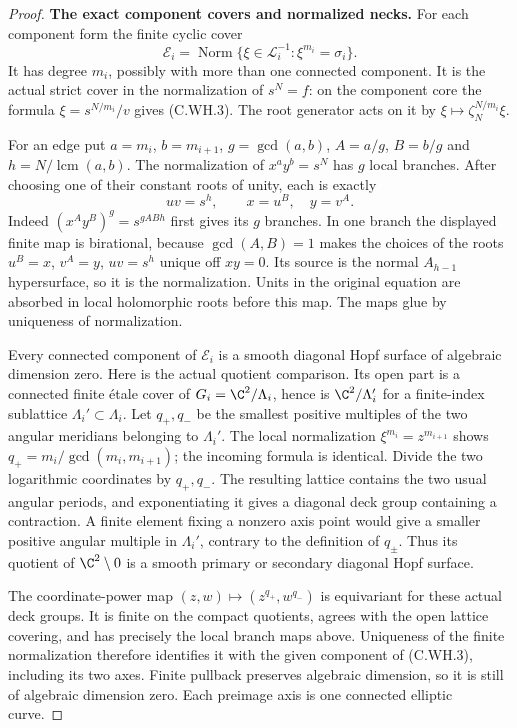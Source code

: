 \begin{proof}
\par\medskip\noindent\textbf{The exact component covers and normalized necks.}
For each component form the finite cyclic
cover
\[
 \mathcal E_i=
 \operatorname{Norm}
 \{\xi\in\mathcal L_i^{-1}:
                         \xi^{m_i}=\sigma_i\}.
\tag{C.WH.3}
\]
It has degree $m_i$, possibly with more
than one connected component. It is
the actual strict cover in the
normalization of $s^N=f$:
on the component core the formula
$\xi=s^{N/m_i}/v$ gives (C.WH.3).
The root generator acts on it by
$\xi\mapsto\zeta_N^{N/m_i}\xi$.

For an edge put $a=m_i$, $b=m_{i+1}$,
$g=\gcd(a,b)$, $A=a/g$, $B=b/g$ and
$h=N/\operatorname{lcm}(a,b)$.
The normalization of $x^a y^b=s^N$
has $g$ local branches. After choosing
one of their constant roots of unity,
each is exactly
\[
      uv=s^h,\qquad x=u^B,\quad y=v^A.
\tag{C.WH.4}
\]
Indeed $(x^Ay^B)^g=s^{gABh}$ first
gives its $g$ branches. In one branch
the displayed finite map is
birational, because $\gcd(A,B)=1$
makes the choices of the roots
$u^B=x$, $v^A=y$, $uv=s^h$ unique
off $xy=0$. Its source is the normal
$A_{h-1}$ hypersurface, so it is the
normalization. Units in the original
equation are absorbed in local
holomorphic roots before this map.
The maps glue by uniqueness of
normalization.

Every connected component of
$\mathcal E_i$ is a smooth diagonal
Hopf surface of algebraic dimension
zero. Here is the actual quotient
comparison. Its open part is a
connected finite \'{e}tale cover of
$G_i=\C^2/\Lambda_i$, hence is
$\C^2/\Lambda_i'$ for a finite-index
sublattice $\Lambda_i'\subset\Lambda_i$.
Let $q_+,q_-$ be the smallest positive
multiples of the two angular meridians
belonging to $\Lambda_i'$.
The local normalization
$\xi^{m_i}=z^{m_{i+1}}$ shows
$q_+=m_i/\gcd(m_i,m_{i+1})$;
the incoming formula is identical.
Divide the two logarithmic coordinates
by $q_+,q_-$. The resulting lattice
contains the two usual angular periods,
and exponentiating it gives a diagonal
deck group containing a contraction.
A finite element fixing a nonzero axis
point would give a smaller positive
angular multiple in $\Lambda_i'$,
contrary to the definition of $q_\pm$.
Thus its quotient of $\C^2\setminus0$
is a smooth primary or secondary
diagonal Hopf surface.

The coordinate-power map
$(z,w)\mapsto(z^{q_+},w^{q_-})$
is equivariant for these actual deck
groups. It is finite on the compact
quotients, agrees with the open
lattice covering, and has precisely
the local branch maps above. Uniqueness
of the finite normalization therefore
identifies it with the given component
of (C.WH.3), including its two axes.
Finite pullback preserves algebraic
dimension, so it is still of algebraic
dimension zero. Each preimage axis is
one connected elliptic curve.


\end{proof}

